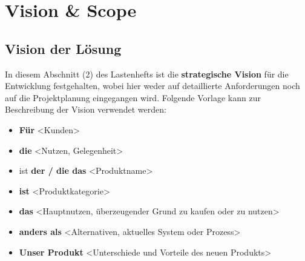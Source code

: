 \section{Vision \& Scope}

\subsection*{Vision der Lösung}
In diesem Abschnitt (2) des Lastenhefts ist die \textbf{strategische Vision} für die Entwicklung festgehalten, wobei hier weder auf  detaillierte Anforderungen noch auf die Projektplanung eingegangen wird.
Folgende Vorlage kann zur Beschreibung der Vision verwendet werden:
\begin{itemize}
    \item \textbf{Für} <Kunden>
    \item \textbf{die} <Nutzen, Gelegenheit>
    \item ist \textbf{der / die das} <Produktname>
    \item \textbf{ist} <Produktkategorie>
    \item \textbf{das} <Hauptnutzen, überzeugender Grund zu kaufen oder zu nutzen>
    \item \textbf{anders als} <Alternativen, aktuelles System oder Prozess>
    \item \textbf{Unser Produkt} <Unterschiede und Vorteile des neuen Produkts>
\end{itemize}